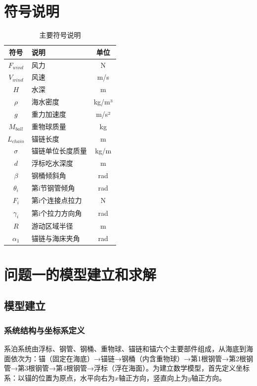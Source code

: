 \documentclass[withoutpreface,bwprint]{cumcmthesis}
\begin{document}
\section{符号说明}
\begin{table}[H]
\centering
\begin{tabularx}{\textwidth}{CLC}
\toprule
符号    & 说明    & 单位 \\
\midrule
$F_{wind}$ & 风力 & N \\
$V_{wind}$ & 风速 & m/s \\
$H$ & 水深 & m \\
$\rho$ & 海水密度 & kg/m³ \\
$g$ & 重力加速度 & m/s² \\
$M_{ball}$ & 重物球质量 & kg \\
$L_{chain}$ & 锚链长度 & m \\
$\sigma$ & 锚链单位长度质量 & kg/m \\
$d$ & 浮标吃水深度 & m \\
$\beta$ & 钢桶倾斜角 & rad \\
$\theta_i$ & 第i节钢管倾角 & rad \\
$F_i$ & 第i个连接点拉力 & N \\
$\gamma_i$ & 第i个拉力方向角 & rad \\
$R$ & 游动区域半径 & m \\
$\alpha_1$ & 锚链与海床夹角 & rad \\
\bottomrule
\end{tabularx}
\caption{主要符号说明}
\label{tab:符号说明}
\end{table}


\section{问题一的模型建立和求解}
\subsection{模型建立}

\subsubsection{系统结构与坐标系定义}

系泊系统由浮标、钢管、钢桶、重物球、锚链和锚六个主要部件组成，从海底到海面依次为：锚（固定在海底）→锚链→钢桶（内含重物球）→第1根钢管→第2根钢管→第3根钢管→第4根钢管→浮标（浮在海面）。为建立数学模型，首先定义坐标系：以锚的位置为原点，水平向右为$x$轴正方向，竖直向上为$y$轴正方向。
\end{document}
